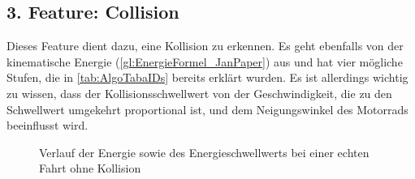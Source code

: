 \subsection{3. Feature: Collision}

Dieses Feature dient dazu, eine Kollision zu erkennen. Es geht ebenfalls von der kinematische Energie (\autoref{gl:EnergieFormel_JanPaper}) aus und hat vier mögliche Stufen, die in \autoref{tab:AlgoTabaIDs} bereits erklärt wurden. Es ist allerdings wichtig zu wissen, dass der Kollisionsschwellwert von der Geschwindigkeit, die zu den Schwellwert umgekehrt proportional ist, und dem Neigungswinkel des Motorrads beeinflusst wird.
 

\begin{figure}[htpb]
	\centering 
	\caption{Verlauf der Energie sowie des Energieschwellwerts bei einer echten Fahrt ohne Kollision}
	\label{fig:CH_ID_2546_FullView}
\end{figure}

